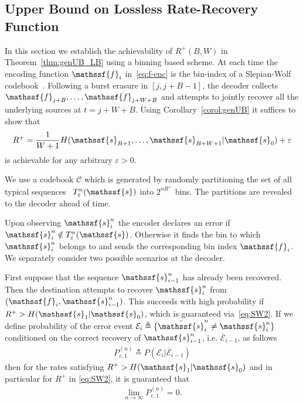 \documentclass[journal, twocolumn, 10pt]{IEEEtran}
\newcommand{\cC}{{\mathcal{C}}}
\newcommand{\eps}{\varepsilon}
\newcommand{\rvf}{{\mathssf{f}}}    %
\newcommand{\rvs}{{\mathssf{s}}}    %
\begin{document}
\subsection{Upper Bound on Lossless Rate-Recovery Function}
\label{sec:UBLB}
In this section we establish the achievability of $R^+(B,W)$ in Theorem~\ref{thm:genUB_LB} using a  binning based scheme.  At each time the encoding function $\rvf_i$ in~\eqref{eq:f-enc}  is  the bin-index of  a Slepian-Wolf codebook~\cite{Cover95, slepianWolf:73}. Following a burst  erasure in $[j,j+B-1]$, the decoder collects $\rvf_{j+B},\ldots, \rvf_{j+W+B}$ and attempts to jointly recover all the underlying sources  at $t=j+W+B$.  Using 
 Corollary~\ref{corol:genUB} it suffices to show that
\begin{equation}
R^+  = \frac{1}{W+1} H(\rvs_{B+1}, \ldots, \rvs_{B+W+1}|\rvs_0) + \eps\label{eq:SW2} 
\end{equation}
is achievable for any arbitrary $\eps > 0$.

We use a  codebook $\cC$ which is generated by randomly partitioning the set of all typical sequences
~$T_\eps^n(\rvs)$ into $2^{nR^+}$ bins. %
The partitions are revealed to the  decoder ahead of time. 

Upon observing $\rvs_i^n$ the encoder declares an error if $\rvs_i^n \notin T_\eps^n(\rvs)$. Otherwise it finds the bin to which $\rvs_i^n$ belongs to and sends the corresponding bin index $\rvf_i$. We separately consider two possible scenarios at the decoder.


First suppose that the sequence $\rvs_{i-1}^n$ has already been recovered. Then the destination attempts to recover $\rvs_i^n$ from  $(\rvf_i, \rvs_{i-1}^n)$. This succeeds with high probability if $R^+ > H(\rvs_1 |\rvs_0)$, which is guaranteed via~\eqref{eq:SW2}. If we define probability of the error event $\mathcal{E}_{i}\triangleq \{\hat{\rvs}^n_{i}\neq \rvs^n_{i}\}$ conditioned on the correct recovery of $\rvs^n_{i-1}$, i.e. $ \overline{\mathcal{E}}_{i-1}$, as follows
\begin{align}
P^{(n)}_{e,1} \triangleq P(\mathcal{E}_{i} | \overline{\mathcal{E}}_{i-1}) \label{eq:eps1}
\end{align} then for the rates satisfying $R^+ > H(\rvs_1 |\rvs_0)$ and in particular for $R^{+}$ in \eqref{eq:SW2}, it is guaranteed that
\begin{align}
\lim_{n\to \infty} P^{(n)}_{e,1} = 0\label{eq:lim1}.
\end{align} 
\end{document}
